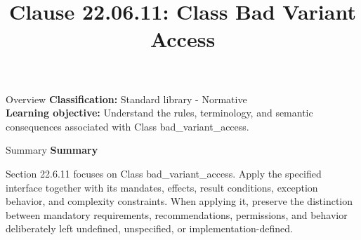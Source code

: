 \documentclass[10pt,letterpaper]{article}
\title{Clause 22.06.11: Class Bad Variant Access}
\author{}
\date{}
\begin{document}
\maketitle
\begin{CornellOverviewBox}{Overview}
\textbf{Classification:} Standard library - Normative\\[2pt]
\textbf{Learning objective:} Understand the rules, terminology, and semantic consequences associated with Class bad\_variant\_access.
\end{CornellOverviewBox}\begin{CornellSummaryBox}{Summary}
{\sffamily\bfseries\color{Accent} Summary}\par\vspace{3pt}Section 22.6.11 focuses on Class bad\_variant\_access. Apply the specified interface together with its mandates, effects, result conditions, exception behavior, and complexity constraints. When applying it, preserve the distinction between mandatory requirements, recommendations, permissions, and behavior deliberately left undefined, unspecified, or implementation-defined.
\end{CornellSummaryBox}
\end{document}

